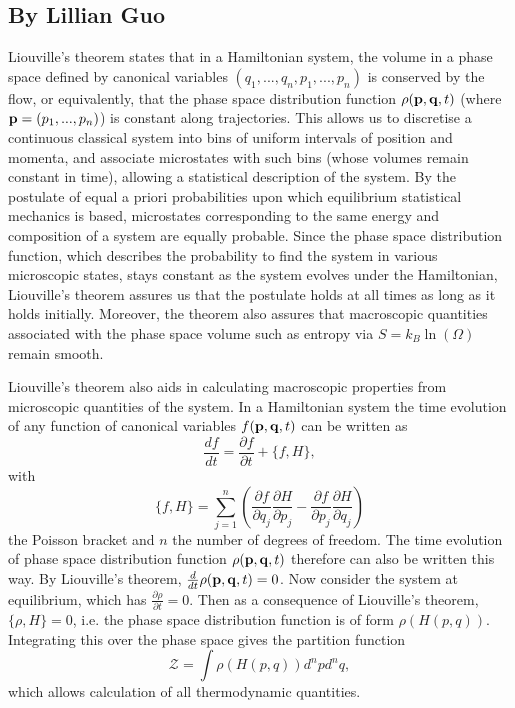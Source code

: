 \subsection*{By Lillian Guo}

Liouville's theorem states that in a Hamiltonian system, the volume in a phase space defined by canonical variables $(q_1, ..., q_n, p_1, ..., p_n)$ is conserved by the flow, or equivalently, that the phase space distribution function $\rho({\bf p}, {\bf q}, t)$ (where ${\bf p} = (p_1, ..., p_n)$) is constant along trajectories. This allows us to discretise a continuous classical system into bins of uniform intervals of position and momenta, and associate microstates with such bins (whose volumes remain constant in time), allowing a statistical description of the system. By the postulate of equal a priori probabilities upon which equilibrium statistical mechanics is based, microstates corresponding to the same energy and composition of a system are equally probable. Since the phase space distribution function, which describes the probability to find the system in various microscopic states, stays constant as the system evolves under the Hamiltonian, Liouville's theorem assures us that the postulate holds at all times as long as it holds initially. Moreover, the theorem also assures that macroscopic quantities associated with the phase space volume such as entropy via $S = k_B \ln(\Omega)$ remain smooth.\par 

Liouville's theorem also aids in calculating macroscopic properties from microscopic quantities of the system. In a Hamiltonian system the time evolution of any function of canonical variables $f({\bf p}, {\bf q}, t)$ can be written as
\begin{equation}
\frac{df}{dt} = \frac{\partial f}{\partial t} + \{f, H\},
\end{equation}
with
\begin{equation}
\{f, H\} = \sum_{j=1}^n \left( \frac{\partial f}{\partial q_j} \frac{\partial H}{\partial p_j} - \frac{\partial f}{\partial p_j} \frac{\partial H}{\partial q_j}\right)
\end{equation}
the Poisson bracket and $n$ the number of degrees of freedom. The time evolution of phase space distribution function $\rho({\bf p}, {\bf q}, t)$ therefore can also be written this way. By Liouville's theorem, $\frac{d}{dt} \rho({\bf p}, {\bf q}, t) =0$. Now consider the system at equilibrium, which has $\frac{\partial \rho}{\partial t} = 0$. Then as a consequence of Liouville's theorem, $\{\rho, H\} = 0$, i.e. the phase space distribution function is of form $\rho(H(p, q))$. Integrating this over the phase space gives the partition function 
\begin{equation*}
\mathcal{Z} = \int  \rho(H(p, q))d^n p d^n q,
\end{equation*}
which allows calculation of all thermodynamic quantities.\par